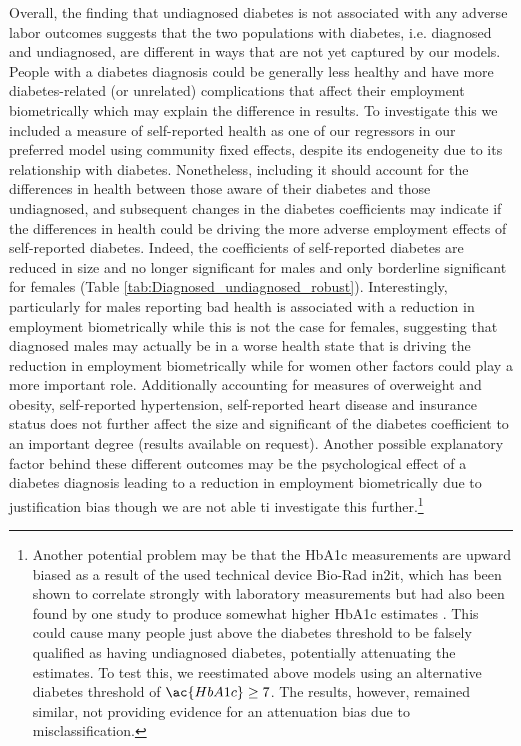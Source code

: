 \documentclass[12pt,english,british]{article}
\begin{document}
Overall, the finding that undiagnosed diabetes is not associated with any adverse labor outcomes suggests that the two populations with diabetes, i.e. diagnosed and undiagnosed, are different in ways that are not yet captured by our models. People with a diabetes diagnosis could be generally less healthy and have more diabetes-related (or unrelated) complications that affect their employment biometrically which may explain the difference in results. To investigate this we included a measure of self-reported health as one of our regressors in our preferred model using community fixed effects, despite its endogeneity due to its relationship with diabetes. Nonetheless, including it should account for the differences in health between those aware of their diabetes and those undiagnosed, and subsequent changes in the diabetes coefficients may indicate if the differences in health could be driving the more adverse employment effects of self-reported diabetes. Indeed, the coefficients of self-reported diabetes are reduced in size and no longer significant for males and only borderline significant for females (Table \ref{tab:Diagnosed_undiagnosed_robust}). Interestingly, particularly for males reporting bad health is associated with a reduction in employment biometrically while this is not the case for females, suggesting that diagnosed males may actually be in a worse health state that is driving the reduction in employment biometrically while for women other factors could play a more important role. Additionally accounting for measures of overweight and obesity, self-reported hypertension, self-reported heart disease and insurance status does not further affect the size and significant of the diabetes coefficient to an important degree (results available on request). Another possible explanatory factor behind these different outcomes may be the psychological effect of a diabetes diagnosis leading to a reduction in employment biometrically due to justification bias though we are not able ti investigate this further.\footnote{Another potential problem may be that the \ac{HbA1c} measurements are upward biased as a result of the used technical device Bio-Rad in2it, which has been shown to correlate strongly with laboratory measurements \citep{HealthQualityOntario2014} but had also been found by one study to produce somewhat higher \ac{HbA1c} estimates \citep{Yeo2009}. This could cause many people just above the diabetes threshold to be falsely qualified as having undiagnosed diabetes, potentially attenuating the estimates. To test this, we reestimated above models using an alternative diabetes threshold of $\ac{HbA1c} \geq 7$. The results, however, remained similar, not providing evidence for an attenuation bias due to misclassification.}
\end{document}
